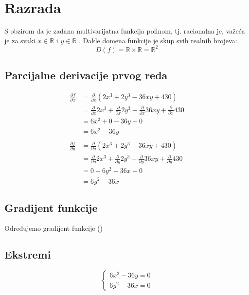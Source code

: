 \chapter{Razrada}

S obzirom da je zadana multivarijatna funkcija polinom, tj. racionalna je, važeća je za svaki $x \in \mathbb{R}$ i $y \in \mathbb{R}$ \cite[vidi][stranica 119]{kolegij}.
Dakle domena funkcije je skup svih realnih brojeva:
$$
    D(f) = \mathbb{R} \times \mathbb{R} = \mathbb{R}^2
$$

\section{Parcijalne derivacije prvog reda}

\begin{align*}
    \frac{\partial f}{\partial x} & = \frac{\partial}{\partial x} (2x^3 + 2y^3 - 36xy + 430) \\
    & = \frac{\partial}{\partial x} 2x^3 + \frac{\partial}{\partial x}2y^3 - \frac{\partial}{\partial x}36xy + \frac{\partial}{\partial x}430 \\
    & = 6x^2 + 0 - 36y + 0 \\
    & = 6x^2 - 36y \\
    \\
    \frac{\partial f}{\partial y} & = \frac{\partial}{\partial y} (2x^3 + 2y^3 - 36xy + 430) \\
    & = \frac{\partial}{\partial y} 2x^3 + \frac{\partial}{\partial y}2y^3 - \frac{\partial}{\partial y}36xy + \frac{\partial}{\partial y}430 \\
    & = 0 + 6y^2 - 36x + 0\\
    & = 6y^2 - 36x
\end{align*}

\section{Gradijent funkcije}

Određujemo gradijent funkcije ()

\section{Ekstremi}

$$
\begin{cases}
    6x^2 - 36y = 0 \\
    6y^2 - 36x = 0
\end{cases}
$$

